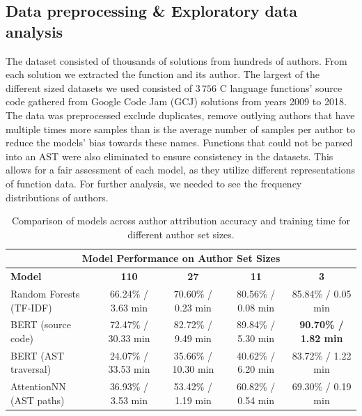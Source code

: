 \documentclass[conference]{IEEEtran}
\begin{document}
    
    

\subsection{Data preprocessing \& Exploratory data analysis}
The dataset consisted of thousands of solutions from hundreds of authors. From each solution we extracted the function and its author.
The largest of the different sized datasets we used consisted of $3\,756$ C language functions' source code gathered from Google Code Jam (GCJ) solutions from years 2009 to 2018. The data was preprocessed exclude duplicates, 
remove outlying authors that have multiple times more samples than is the average number of samples per author to reduce the models' bias towards these names. Functions 
that could not be parsed into an AST were also eliminated to ensure consistency in the datasets. This allows for a fair assessment of each model, 
as they utilize different representations of function data. For further analysis, we needed to see the frequency distributions of authors. 


\begin{table}[!t]
    \renewcommand{\arraystretch}{1.3}
    \caption{Comparison of models across author attribution accuracy and training time for different author set sizes.}
    \label{tab:comparison_models}
    \centering
    \begin{tabular}{lcccc}
    \hline
    \multicolumn{5}{c}{\textbf{Model Performance on Author Set Sizes}} \\
    \hline
    \textbf{Model} & \textbf{110} & \textbf{27} & \textbf{11} & \textbf{3} \\
    \hline
    Random Forests (TF-IDF) & 66.24\% / 3.63 min & 70.60\% / 0.23 min & 80.56\% / 0.08 min & 85.84\% / 0.05 min \\
    BERT (source code)    & 72.47\% / 30.33 min & 82.72\% / 9.49 min & 89.84\% / 5.30 min  & \textbf{90.70\% / 1.82 min} \\
    BERT (AST traversal)  & 24.07\% / 33.53 min & 35.66\% / 10.30 min & 40.62\% / 6.20 min  & 83.72\% / 1.22 min \\
    AttentionNN (AST paths)& 36.93\% / 3.53 min  & 53.42\% / 1.19 min  & 60.82\% / 0.54 min  & 69.30\% / 0.19 min \\
    \hline
    \end{tabular}
\end{table}
\end{document}
